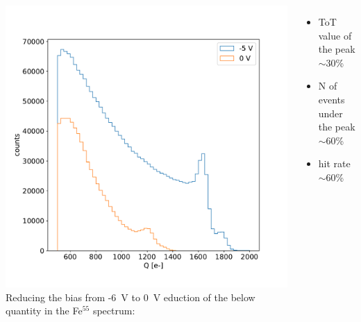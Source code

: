 \begin{frame}
        \begin{columns}
            \includegraphics[width=1.2\linewidth]{figures/charaterization/Fe_spectrum_bias.pdf}
            Reducing the bias from -\SI{6}{V} to \SI{0}{V} eduction of the below quantity in the Fe$^{55}$ spectrum: 
            \begin{itemize}
                \item ToT value of the peak $\sim$30\%
                \item N of events under the peak $\sim$60\%
                \item hit rate $\sim$60\%
            \end{itemize}
          
        \end{columns}
    \end{frame}      


